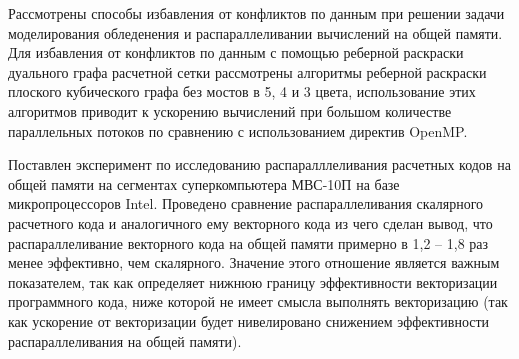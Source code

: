 Рассмотрены способы избавления от конфликтов по данным при решении задачи моделирования обледенения и распараллеливании вычислений на общей памяти.
Для избавления от конфликтов по данным с помощью реберной раскраски дуального графа расчетной сетки рассмотрены алгоритмы реберной раскраски плоского кубического графа без мостов в 5, 4 и 3 цвета, использование этих алгоритмов приводит к ускорению вычислений при большом количестве параллельных потоков по сравнению с использованием директив OpenMP.

Поставлен эксперимент по исследованию распаралллеливания расчетных кодов на общей памяти на сегментах суперкомпьютера МВС-10П на базе микропроцессоров Intel.
Проведено сравнение распараллеливания скалярного расчетного кода и аналогичного ему векторного кода из чего сделан вывод, что распараллеливание векторного кода на общей памяти примерно в 1,2 -- 1,8 раз менее эффективно, чем скалярного.
Значение этого отношение является важным показателем, так как определяет нижнюю границу эффективности векторизации программного кода, ниже которой не имеет смысла выполнять векторизацию (так как ускорение от векторизации будет нивелировано снижением эффективности распараллеливания на общей памяти).

